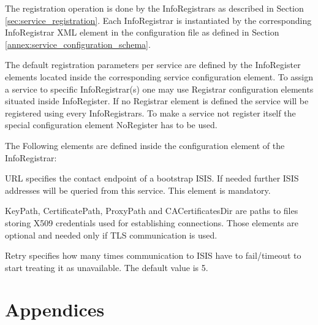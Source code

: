 \documentclass{book}
\begin{document}
The registration operation is done by the InfoRegistrars as described in Section \ref{sec:service_registration}.
Each InfoRegistrar is instantiated by the corresponding InfoRegistrar XML element in the configuration file as 
defined in Section \ref{annex:service_configuration_schema}.

The default registration parameters per service are defined by the InfoRegister elements located inside the corresponding 
service configuration element. To assign a service to specific InfoRegistrar(s) one may use Registrar 
configuration elements situated inside InfoRegister. If no Registrar element is defined the service will 
be registered using every InfoRegistrars. To make a service not register itself the special configuration element 
NoRegister has to be used.

The Following elements are defined inside the configuration element of the InfoRegistrar:
\begin{description}
\item{URL} specifies the contact endpoint of a bootstrap ISIS. If needed further ISIS addresses will be 
queried from this service. This element is mandatory.
\item{KeyPath, CertificatePath, ProxyPath and CACertificatesDir} are paths to files storing X509 
credentials used for establishing connections. Those elements are optional and needed only if 
TLS communication is used.
\item{Retry} specifies how many times communication to ISIS have to fail/timeout to start treating it
as unavailable. The default value is 5.
\end{description}




\chapter{Appendices}
\end{document}
